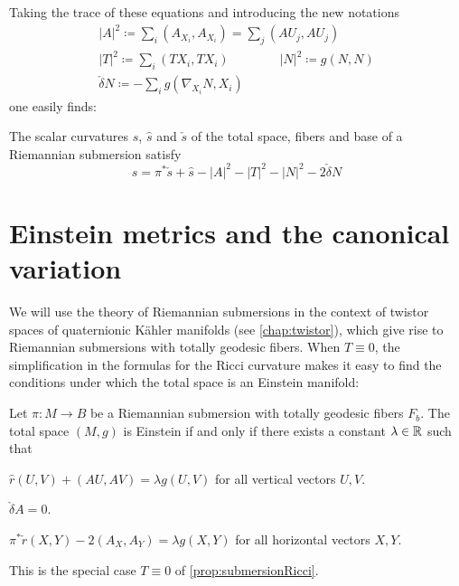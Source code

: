 Taking the trace of these equations and introducing the new notations
\begin{gather*}
	\lvert A\rvert^2\coloneqq \sum_i (A_{X_i},A_{X_i})=\sum_j (A U_j,A U_j)\\
	\lvert T\rvert^2\coloneqq \sum_i (T X_i, T X_i)\qquad \qquad
	\lvert N\rvert^2\coloneqq g(N,N)\\
	\check\delta N\coloneqq -\sum_i g(\nabla_{X_i}N,X_i)
\end{gather*}
one easily finds:

\begin{cor}
	The scalar curvatures $s$, $\hat s$ and $\check s$ of the total space, fibers and base of a Riemannian submersion satisfy
	\begin{equation*}
		s=\pi^*\check s+\hat s -\lvert A\rvert^2-\lvert T\rvert^2-\lvert N\rvert^2-2\check\delta N
	\end{equation*}
\end{cor}

\section{Einstein metrics and the canonical variation}

We will use the theory of Riemannian submersions in the context of twistor spaces of quaternionic K\"ahler manifolds (see \cref{chap:twistor}), which give rise to Riemannian submersions with totally geodesic fibers. When $T\equiv 0$, the simplification in the formulas for the Ricci curvature makes it easy to find the conditions under which the total space is an Einstein manifold:

\begin{prop}\label{prop:totallygeodesicEinstein}
	Let $\pi:M\to B$ be a Riemannian submersion with totally geodesic fibers $F_b$. The total space $(M,g)$ is Einstein if and only if there exists a constant $\lambda\in\mathbb{R}$ such that
	\begin{numberedlist}
		\item $\hat r(U,V)+(AU,AV)=\lambda g(U,V)$ for all vertical vectors $U,V$.
		\item $\check\delta A=0$.
		\item $\pi^*\check r(X,Y)-2(A_X,A_Y)=\lambda g(X,Y)$ for all horizontal vectors $X,Y$.
	\end{numberedlist}
\end{prop}
\begin{myproof}
	This is the special case $T\equiv 0$ of \cref{prop:submersionRicci}.
\end{myproof}

